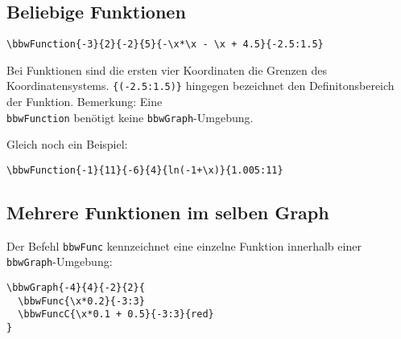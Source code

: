 \subsection{Beliebige Funktionen}
\begin{verbatim}
\bbwFunction{-3}{2}{-2}{5}{-\x*\x - \x + 4.5}{-2.5:1.5}
\end{verbatim}

Bei Funktionen sind die ersten vier Koordinaten die Grenzen des Koordinatensystems. \texttt{\{(-2.5:1.5)\}} hingegen bezeichnet den Definitonsbereich der Funktion.
Bemerkung: Eine \texttt{\\bbwFunction} benötigt
keine \texttt{bbwGraph}-Umgebung.
\newpage

Gleich noch ein Beispiel:

\begin{verbatim}
\bbwFunction{-1}{11}{-6}{4}{ln(-1+\x)}{1.005:11}
\end{verbatim}
\newpage


\subsection{Mehrere Funktionen im selben Graph}
Der Befehl \texttt{bbwFunc} kennzeichnet eine einzelne Funktion
innerhalb einer \texttt{bbwGraph}-Umgebung:

\begin{verbatim}
\bbwGraph{-4}{4}{-2}{2}{
  \bbwFunc{\x*0.2}{-3:3}
  \bbwFuncC{\x*0.1 + 0.5}{-3:3}{red}
}
\end{verbatim}


